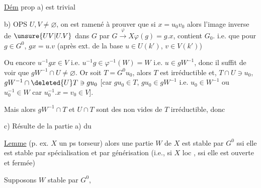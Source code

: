 
\uline{Dém} prop \qquad a) est trivial \qquad{}

b)  OPS $U,V\ne\varnothing$,  on est ramené à prouver que si  $x=u_0v_0$   alors l'image inverse de $\unsure{UV|U.V}$ dans $G$ par $G\xrightarrow{\varphi}X$\quad $\varphi(g)=g.x$,  contient $G_0$. i.e. que pour $g\in G^0$, \unsure{\ldots} $gx=u.v$ (après ext. de la base  $u\in U(k')$, $v\in V(k')$)

 Ou encore $u^{-1}gx\in V$ i.e. $u^{-1}g\in\varphi^{-1}(W)=W$ i.e.  $u\in gW^{-1}$, donc il suffit de voir que $gW^{-1}\cap U\ne\varnothing$. Or soit $T=G^0u_0$, alors  $T$ est irréductible et,  $T\cap U\ni u_0$, $gW^{-1}\cap\deleted{U}T\ni gu_0$ [car $gu_0\in T$, $gu_0\in gW^{-1}$ i.e. $u_0\in W^{-1}$ ou $u_0^{-1}\in W$ car $u_0^{-1}.x=v_0\in V$].

Mais alors $gW^{-1}\cap T$ et $U\cap T$ sont des  non vides de $T$ irréductible, donc  

c) Résulte de la partie a) du

\uline{Lemme}    (p. ex. $X$ un ps torseur) alors une partie $W$ de $X$ est stable par $G^0$ ssi elle est stable par spécialisation et par générisation (i.e., si $X$ loc , ssi elle est ouverte et fermée)

  Supposons $W$ stable par $G^0$,       

